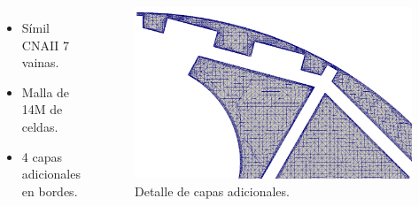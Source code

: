 \documentclass[9pt,mathserif]{beamer}
\begin{document}
{\begin{columns}
    \begin{minipage}[c][0.4\textheight][c]{\linewidth}
      \begin{itemize}
      \item Símil CNAII 7 vainas.
      \item Malla de 14M de celdas.
      \item 4 capas adicionales en bordes.
      \end{itemize}
    \end{minipage}
    
    \begin{minipage}[c][0.5\textheight][c]{\linewidth}
      \begin{figure}
        \hspace{-1.5cm}   
        \includegraphics[width=0.95\linewidth]{figsATUCHA/atucha_mesh3a.png} \vspace{-3mm}
        \caption{Detalle de capas adicionales.}
        \end{figure}
    \end{minipage}
  \end{columns}
}
\end{document}
